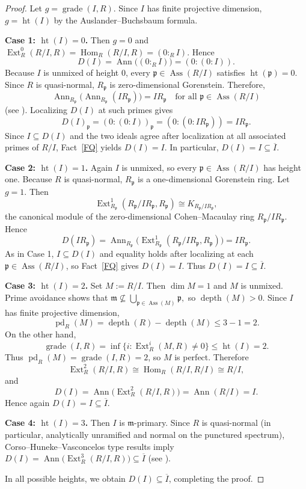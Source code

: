 \documentclass[11pt,a4paper]{amsart}
\numberwithin{equation}{section}
\DeclareMathOperator{\Ass}{Ass}
\DeclareMathOperator{\grade}{grade}
\DeclareMathOperator{\Ann}{Ann}\DeclareMathOperator{\ann}{Ann}
\DeclareMathOperator{\Ht}{ht}
\DeclareMathOperator{\pd}{pd}
\DeclareMathOperator{\Ext}{Ext}
\DeclareMathOperator{\Hom}{Hom}
\DeclareMathOperator{\depth}{depth}
\newcommand{\fm}{\mathfrak{m}}
\newcommand{\fp}{\mathfrak{p}}
\begin{document}
\begin{proof}
	Let $g=\grade(I,R)$. Since $I$ has finite projective dimension, $g=\Ht(I)$ by the Auslander–Buchsbaum formula.
	
	\medskip
	\noindent\textbf{Case 1: $\Ht(I)=0$.}
	Then $g=0$ and
	\(
	\Ext^0_R(R/I,R)=\Hom_R(R/I,R)=(0:_RI).
	\)
	Hence
	\[
	D(I)=\Ann\!\big((0:_RI)\big)=(0:(0:I)).
	\]
	Because $I$ is unmixed of height $0$, every $\fp\in\Ass(R/I)$ satisfies $\Ht(\fp)=0$. Since $R$ is quasi-normal, $R_\fp$ is zero-dimensional Gorenstein. Therefore,
	\[
	\Ann_{R_\fp}\!\big(\Ann_{R_\fp}(IR_\fp)\big)=IR_\fp
	\quad\text{for all }\fp\in\Ass(R/I)
	\]
	(see \cite[Ex.~3.2.15]{BH}). Localizing $D(I)$ at such primes gives
	\[
	D(I)_\fp=(0:(0:I))_\fp=(0:(0:IR_\fp))=IR_\fp.
	\]
	Since $I\subseteq D(I)$ and the two ideals agree after localization at all associated primes of $R/I$, Fact~\ref{FQ} yields $D(I)=I$. In particular,
	\(
	D(I)=I\subseteq \overline{I}.
	\)
	
	\medskip
	\noindent\textbf{Case 2: $\Ht(I)=1$.}
	Again $I$ is unmixed, so every $\fp\in\Ass(R/I)$ has height one. Because $R$ is quasi-normal, $R_\fp$ is a one-dimensional Gorenstein ring. Let $g=1$. Then
	\[
	\Ext^1_{R_\fp}(R_\fp/IR_\fp,R_\fp)\cong K_{R_\fp/IR_\fp},
	\]
	the canonical module of the zero-dimensional Cohen–Macaulay ring $R_\fp/IR_\fp$. Hence
	\[
	D(IR_\fp)=\Ann_{R_\fp}\!\big(\Ext^1_{R_\fp}(R_\fp/IR_\fp,R_\fp)\big)=IR_\fp.
	\]
	As in Case 1, $I\subseteq D(I)$ and equality holds after localizing at each $\fp\in\Ass(R/I)$, so Fact~\ref{FQ} gives $D(I)=I$. Thus
	\(
	D(I)=I\subseteq \overline{I}.
	\)
	
	\medskip
	\noindent\textbf{Case 3: $\Ht(I)=2$.}
	Set $M:=R/I$. Then $\dim M=1$ and $M$ is unmixed. Prime avoidance shows that
	\(
	\fm \nsubseteq \bigcup_{\fp\in\Ass(M)} \fp,
	\)
	so $\depth(M)>0$. Since $I$ has finite projective dimension,
	\[
	\pd_R(M)=\depth(R)-\depth(M)\le 3-1=2.
	\]
	On the other hand,
	\[
	\grade(I,R)=\inf\{i:\Ext^i_R(M,R)\neq 0\}\le \Ht(I)=2.
	\]
	Thus $\pd_R(M)=\grade(I,R)=2$, so $M$ is perfect. Therefore
	\[
	\Ext^2_R(R/I,R)\cong \Hom_R(R/I,R/I)\cong R/I,
	\]
	and
	\[
	D(I)=\Ann\!\big(\Ext^2_R(R/I,R)\big)=\Ann(R/I)=I.
	\]
	Hence again $D(I)=I\subseteq \overline{I}$.
	
	\medskip
	\noindent\textbf{Case 4: $\Ht(I)=3$.}
	Then $I$ is $\fm$-primary. Since $R$ is quasi-normal (in particular, analytically unramified and normal on the punctured spectrum), Corso–Huneke–Vasconcelos type results imply
	\(
	D(I)=\Ann\!\big(\Ext^3_R(R/I,R)\big)\subseteq \overline{I}
	\)
	(see \cite[2.15]{corso}).
	
	\medskip
	In all possible heights, we obtain $D(I)\subseteq \overline{I}$, completing the proof.
\end{proof}
\end{document}
